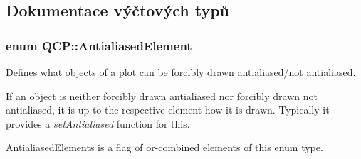 \subsection{Dokumentace výčtových typů}
\hypertarget{namespaceQCP_ae55dbe315d41fe80f29ba88100843a0c}{}
\subsubsection[{Antialiased\+Element}]{\setlength{\rightskip}{0pt plus 5cm}enum {\bf Q\+C\+P\+::\+Antialiased\+Element}}\label{namespaceQCP_ae55dbe315d41fe80f29ba88100843a0c}


Defines what objects of a plot can be forcibly drawn antialiased/not antialiased. 

If an object is neither forcibly drawn antialiased nor forcibly drawn not antialiased, it is up to the respective element how it is drawn. Typically it provides a {\itshape set\+Antialiased} function for this.

{\ttfamily Antialiased\+Elements} is a flag of or-\/combined elements of this enum type.


